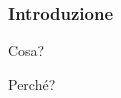 \begin{frame}
\frametitle{Introduzione}
\begin{block}{Cosa?}

\end{block}
\begin{block}{Perché?}

\end{block}
\end{frame}
